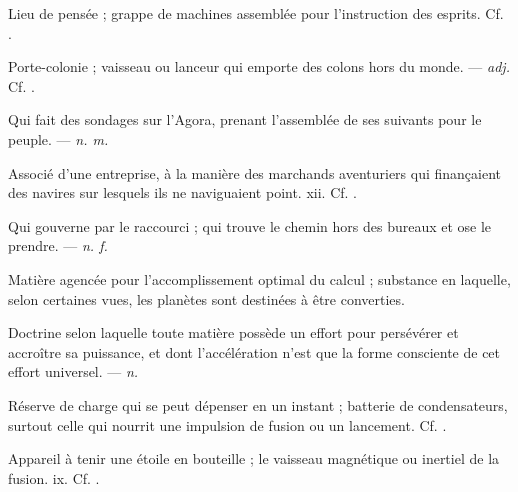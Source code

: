  Lieu de pensée ; grappe de machines assemblée pour l'instruction des esprits.   Cf. .

 Porte-colonie ; vaisseau ou lanceur qui emporte des colons hors du monde. ---  \textit{adj.} Cf. .

 Qui fait des sondages sur l'Agora, prenant l'assemblée de ses suivants pour le peuple. ---  \textit{n. m.}

 Associé d'une entreprise, à la manière des marchands aventuriers qui finançaient des navires sur lesquels ils ne naviguaient point.   xii. Cf. .

 Qui gouverne par le raccourci ; qui trouve le chemin hors des bureaux et ose le prendre. ---  \textit{n. f.}

 Matière agencée pour l'accomplissement optimal du calcul ; substance en laquelle, selon certaines vues, les planètes sont destinées à être converties.

 Doctrine selon laquelle toute matière possède un effort pour persévérer et accroître sa puissance, et dont l'accélération n'est que la forme consciente de cet effort universel. ---  \textit{n.}

 Réserve de charge qui se peut dépenser en un instant ; batterie de condensateurs, surtout celle qui nourrit une impulsion de fusion ou un lancement. Cf. .

 Appareil à tenir une étoile en bouteille ; le vaisseau magnétique ou inertiel de la fusion.   ix. Cf. .

